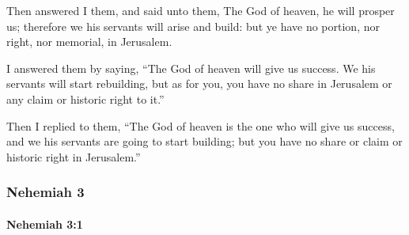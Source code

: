 			\begin{versebox}
					\item[BHS] 
					\item[LXX] 
					\item[ASV] Then answered I them, and said unto them, The God of heaven, he will prosper us; therefore we his servants will arise and build: but ye have no portion, nor right, nor memorial, in Jerusalem.
					\item[NIV] I answered them by saying, “The God of heaven will give us success. We his servants will start rebuilding, but as for you, you have no share in Jerusalem or any claim or historic right to it.”
					\item[NRSV] Then I replied to them, “The God of heaven is the one who will give us success, and we his servants are going to start building; but you have no share or claim or historic right in Jerusalem.”
			\end{versebox}
	\subsubsection{Nehemiah 3} %
		\label{NEHEMIAH-3}

		\paragraph{Nehemiah 3:1} %
			\label{NEHEMIAH-3-1}

